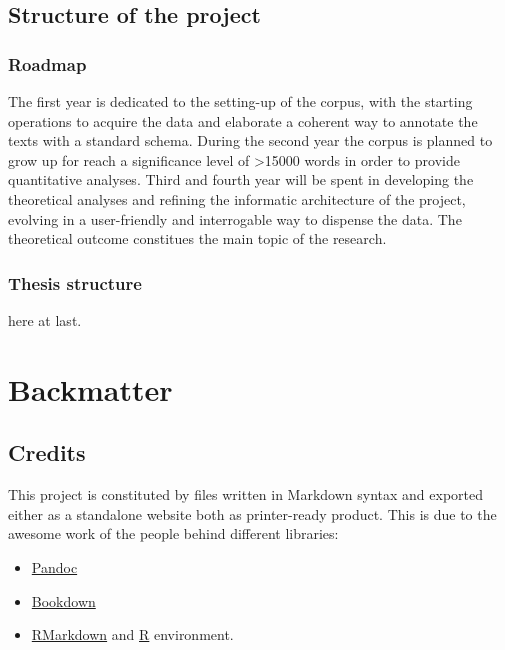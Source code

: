 \documentclass[a4paper,twoside,11pt,chapterprefix=true,listof=totocnumbered,bibliography=totocnumbered]{scrbook}
\providecommand{\tightlist}{%
  \setlength{\itemsep}{0pt}\setlength{\parskip}{0pt}}
\theoremstyle{definition}
\theoremstyle{definition}
\theoremstyle{definition}
\theoremstyle{remark}
\begin{document}
\section{Structure of the project}\label{structure-of-the-project}

\subsection{Roadmap}\label{roadmap}

The first year is dedicated to the setting-up of the corpus, with the
starting operations to acquire the data and elaborate a coherent way to
annotate the texts with a standard schema. During the second year the
corpus is planned to grow up for reach a significance level of
\textgreater{}15000 words in order to provide quantitative analyses.
Third and fourth year will be spent in developing the theoretical
analyses and refining the informatic architecture of the project,
evolving in a user-friendly and interrogable way to dispense the data.
The theoretical outcome constitues the main topic of the research.

\subsection{Thesis structure}\label{thesis-structure}

here at last.

\chapter{Backmatter}\label{backmatter}

\section{Credits}\label{credits}

This project is constituted by files written in Markdown syntax and
exported either as a standalone website both as printer-ready product.
This is due to the awesome work of the people behind different
libraries:

\begin{itemize}
\tightlist
\item
  \href{https://bookdown.org}{Pandoc}
\item
  \href{https://bookdown.org}{Bookdown}
\item
  \href{https://bookdown.org}{RMarkdown} and
  \href{https://bookdown.org}{R} environment.
\end{itemize}
\end{document}
